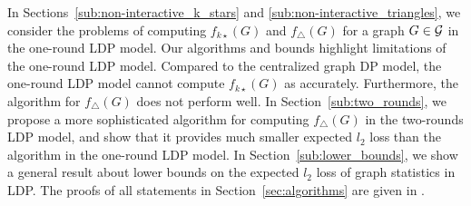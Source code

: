 % 

In 
Sections~\ref{sub:non-interactive_k_stars} and \ref{sub:non-interactive_triangles}, 
we consider the problems of computing $f_{k\star}(G)$ 
and $f_\triangle(G)$ 
for a graph $G \in \mathcal{G}$ in the 
one-round 
LDP model. 
Our algorithms and bounds highlight limitations of the
one-round 
LDP model. Compared to the centralized graph DP model, the
one-round 
LDP model cannot compute $f_{k\star}(G)$ as accurately.
Furthermore, the algorithm for $f_\triangle(G)$ does not perform 
well. 
In Section~\ref{sub:two_rounds}, we propose a more sophisticated algorithm for computing  $f_\triangle(G)$ in the two-rounds LDP model, and show that it provides much smaller expected $l_2$ loss than the algorithm in the one-round LDP model.
In Section~\ref{sub:lower_bounds}, we show a general result about lower bounds on the expected $l_2$ loss of graph statistics in LDP. 
The proofs of all statements in Section~\ref{sec:algorithms} are given in 
.

